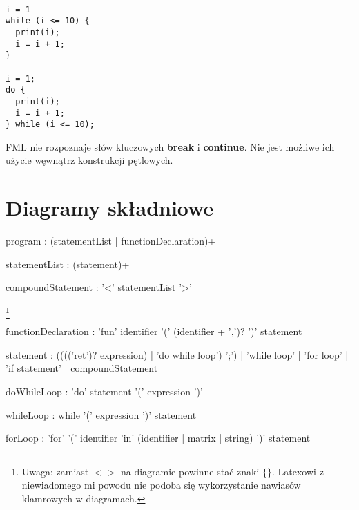 \documentclass[12pt,a4paper]{article}
\begin{document}
\begin{lstlisting}

i = 1
while (i <= 10) {
  print(i);
  i = i + 1;
}

i = 1;
do {
  print(i);
  i = i + 1;
} while (i <= 10);

\end{lstlisting}

FML nie rozpoznaje słów kluczowych \textbf{break} i \textbf{continue}. Nie jest możliwe ich użycie węwnątrz konstrukcji pętlowych.

\pagebreak

\section{Diagramy składniowe}

\begin{rail}
program : (statementList | functionDeclaration)+
\end{rail}

\begin{rail}
statementList : (statement)+ 
\end{rail}

\begin{rail}
compoundStatement : '<' statementList '>'
\end{rail} \footnote{Uwaga: zamiast \textbf{$< >$} na diagramie powinne stać znaki \textbf{$\{ \}$}. Latexowi z niewiadomego mi powodu nie podoba się wykorzystanie nawiasów klamrowych w diagramach.}

\begin{rail}
functionDeclaration : 'fun' identifier '(' (identifier + ',')?  ')' statement
\end{rail}

\begin{rail}
statement : (((('ret')? expression) | 'do while loop') ';') | 'while loop' | 'for loop' | 'if statement' | compoundStatement
\end{rail}

\begin{rail}
doWhileLoop : 'do' statement '(' expression ')'
\end{rail}

\begin{rail}
whileLoop : while '(' expression ')' statement
\end{rail}

\begin{rail}
forLoop : 'for' '(' identifier 'in' (identifier | matrix | string) ')' statement
\end{rail}
\end{document}
